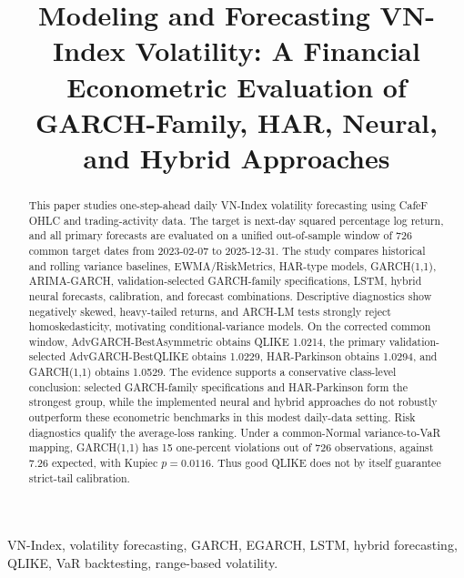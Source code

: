 \documentclass[conference]{IEEEtran}
\begin{document}
\title{Modeling and Forecasting VN-Index Volatility: A Financial Econometric Evaluation of GARCH-Family, HAR, Neural, and Hybrid Approaches}

\author{
}

\maketitle

\begin{abstract}
This paper studies one-step-ahead daily VN-Index volatility forecasting using CafeF OHLC and trading-activity data. The target is next-day squared percentage log return, and all primary forecasts are evaluated on a unified out-of-sample window of 726 common target dates from 2023-02-07 to 2025-12-31. The study compares historical and rolling variance baselines, EWMA/RiskMetrics, HAR-type models, GARCH(1,1), ARIMA-GARCH, validation-selected GARCH-family specifications, LSTM, hybrid neural forecasts, calibration, and forecast combinations. Descriptive diagnostics show negatively skewed, heavy-tailed returns, and ARCH-LM tests strongly reject homoskedasticity, motivating conditional-variance models. On the corrected common window, AdvGARCH-BestAsymmetric obtains QLIKE 1.0214, the primary validation-selected AdvGARCH-BestQLIKE obtains 1.0229, HAR-Parkinson obtains 1.0294, and GARCH(1,1) obtains 1.0529. The evidence supports a conservative class-level conclusion: selected GARCH-family specifications and HAR-Parkinson form the strongest group, while the implemented neural and hybrid approaches do not robustly outperform these econometric benchmarks in this modest daily-data setting. Risk diagnostics qualify the average-loss ranking. Under a common-Normal variance-to-VaR mapping, GARCH(1,1) has 15 one-percent violations out of 726 observations, against 7.26 expected, with Kupiec \(p=0.0116\). Thus good QLIKE does not by itself guarantee strict-tail calibration.
\end{abstract}

\begin{IEEEkeywords}
VN-Index, volatility forecasting, GARCH, EGARCH, LSTM, hybrid forecasting, QLIKE, VaR backtesting, range-based volatility.
\end{IEEEkeywords}










\end{document}
